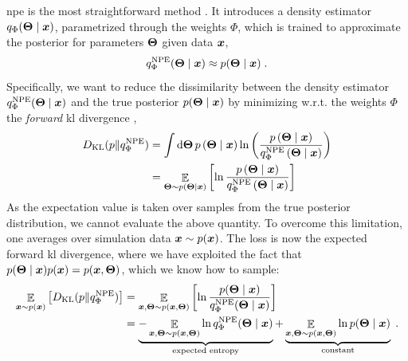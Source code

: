 \Gls*{npe} is the most straightforward method \cite{Papamakarios:2016ctj, Greenberg:2019aa}. It introduces a density estimator $q_\Phi(\bm{\Theta}\mid\bm{x})$, parametrized through the weights $\Phi$, which is trained to approximate the posterior for parameters $\bm{\Theta}$ given data $\bm{x}$,
%
\begin{equation}
    q^\text{NPE}_\Phi(\bm{\Theta} \mid \bm{x}) \approx p(\bm{\Theta}\mid\bm{x})\;.
\end{equation}
%
Specifically, we want to reduce the dissimilarity between the density estimator $q^\text{NPE}_\Phi(\bm{\Theta} \mid \bm{x})$ and the true posterior $p(\bm{\Theta}\mid\bm{x})$ by minimizing w.r.t. the weights $\Phi$ the \emph{forward} \gls*{kl} divergence \cite{Kullback:1951zyt},
%
\begin{align} \label{eq:fkl}
	D_{\mathrm{KL}}(p \| q^\text{NPE}_\Phi) &= \int \dd \bm{\Theta} \,p\left(\bm{\Theta} \mid \bm{x}\right) \ln \left(\frac{p\left(\bm{\Theta} \mid \bm{x}\right)}{q^\text{NPE}_\Phi\left(\bm{\Theta} \mid \bm{x}\right)}\right) \\
	& =\mathop{\mathbb{E}}\limits_{\bm{\Theta} \sim p\left(\bm{\Theta} \mid \bm{x}\right)}\left[\ln \frac{p\left(\bm{\Theta} \mid \bm{x}\right)}{q^\text{NPE}_\Phi\left(\bm{\Theta} \mid \bm{x}\right)}\right]
\end{align}
%
%
As the expectation value is taken over samples from the true posterior distribution, we cannot evaluate the above quantity. To overcome this limitation, one averages over simulation data $\bm{x} \sim p(\bm{x})$. The loss is now the expected forward \gls*{kl} divergence, where we have exploited the fact that $p(\bm{\Theta}\mid \bm{x}) p(\bm{x})=p(\bm{x}, \bm{\Theta})$, which we know how to sample:
%
\begin{align}
	\mathop{\mathbb{E}}\limits_{\bm{x} \sim p(\bm{x})}\left[D_{\mathrm{KL}}(p \| q^\text{NPE}_\Phi)\right] & =\mathop{\mathbb{E}}\limits_{\bm{x}, \bm{\Theta} \sim p(\bm{x}, \bm{\Theta})}\left[\ln \frac{p(\bm{\Theta} \mid \bm{x})}{q^\text{NPE}_\Phi(\bm{\Theta} \mid \bm{x})}\right] \\
	& =\underbrace{-\mathop{\mathbb{E}}\limits_{\bm{x}, \bm{\Theta} \sim p(\bm{x}, \bm{\Theta})} \ln q^\text{NPE}_\Phi(\bm{\Theta} \mid \bm{x})}_{\text{expected entropy}}+\underbrace{\mathop{\mathbb{E}}\limits_{\bm{x}, \bm{\Theta} \sim p(\bm{x}, \bm{\Theta})} \ln p(\bm{\Theta} \mid \bm{x})}_{\text {constant}} \;.
\end{align}


